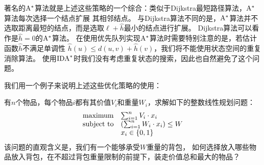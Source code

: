 著名的${\rm A}^*$算法就是上述这些策略的一个综合：类似于Dijkstra最短路径算法，${\rm A}^*$算法每次选择一个结点扩展
其相邻结点。
与Dijkstra算法不同的是，${\rm A}^*$算法并不选取距离最短的结点，而是选取$\ell + \hat h$最小的结点进行扩展。
Dijkstra算法可以看作是$\hat h=0$的${\rm A}^*$算法。
在使用优先队列实现${\rm A}^*$算法时需要特别注意的是，若估计函数$\hat h$不满足单调性
$\hat h(u)\le d(u, v) + \hat h(v)$，我们将不能使用状态空间的重复消除算法。
使用${\rm IDA}^*$时我们没有考虑重复状态的搜索，因此也自然避免了这个问题。

我们用一个例子来说明上述这些优化策略的使用：

\begin{prob}[01背包]
 有$n$个物品，每个物品$i$都有其价值$V_i$和重量$W_i$，求解如下的整数线性规划问题：
 $$\begin{array}{rl}
  {\rm maximum}     & \sum_{i=1}^n V_i\cdot x_i \\
  {\rm subject\ to} & \left( \sum_{i=1}^n W_i\cdot x_i \right) \leq W \\
                   & x_i \in \{0, 1\}\\
   \end{array}
 $$
 该问题的直观含义是，我们有一个能够承受$W$重量的背包，
 如何选择放入哪些物品放入背包，在不超过背包重量限制的前提下，装走价值总和最大的物品？
\end{prob}

